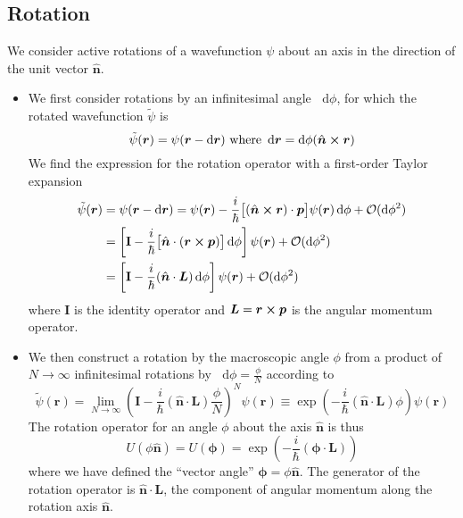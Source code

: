 \documentclass[11pt, a4paper]{article}
\newcommand{\diff}{\mathop{}\!\mathrm{d}} %
\renewcommand{\vec}[1]{\bm{#1}} %
\newcommand{\mat}[1]{\mathbf{#1}} %
\newcommand{\uvec}[1]{\hat{\vec{#1}}} %
\renewcommand{\t}[1]{\tilde{#1}}
\renewcommand{\r}{\vec{r}}  %
\newcommand{\p}{\psi}  %
\begin{document}
\subsection{Rotation}
We consider active rotations of a wavefunction $ \psi $ about an axis in the direction of the unit vector $ \uvec{n} $. 
\begin{itemize}
	\item We first consider rotations by an infinitesimal angle $ \diff \phi $, for which the rotated wavefunction $ \t{\p} $ is
	\begin{equation*}
		\t{\p}(\r) = \p(\r - \diff \r) \ \text{where } \diff \r = \diff \phi (\uvec{n} \cross \r)
	\end{equation*}
	We find the expression for the rotation operator with a first-order Taylor expansion
	\begin{align*}
		\t{\p}(\r) &= \p(\r - \diff \r) = \p(\r) - \frac{i}{\hbar}\big[(\uvec{n}\cross \r) \cdot \vec{p}\big]\p(\r)\diff \phi + \mathcal{O} (\diff \phi^{2})\\
		& = \left[\mat{I} - \frac{i}{\hbar}\big[\uvec{n}\cdot (\r \cross \vec{p})\big]\diff \phi\right] \p(\r)  + \mathcal{O} (\diff \phi^{2})\\
		& = \left[\mat{I} - \frac{i}{\hbar}(\uvec{n}\cdot \vec{L})\diff \phi\right] \p(\r) + \mathcal{O} (\diff \phi^{2})
	\end{align*}
	where $ \mat{I} $ is the identity operator and $ \vec{L} = \r \cross \vec{p} $ is the angular momentum operator. 
	
	\item We then construct a rotation by the macroscopic angle $ \phi $ from a product of $ N \to \infty $ infinitesimal rotations by $ \diff \phi = \frac{\phi}{N} $ according to 
	\begin{equation*}
		\tilde{\p}(\r) = \lim_{N \to \infty} \left(\mat{I} - \frac{i}{\hbar}(\uvec{n}\cdot \vec{L})  \frac{\phi}{N} \right)^{N}\p(\r) \equiv \exp(- \frac{i}{\hbar}(\uvec{n}\cdot \vec{L})\phi) \p(\r)
	\end{equation*}
	The rotation operator for an angle $ \phi $ about the axis $ \uvec{n} $ is thus
	\begin{equation*}
		U(\phi \uvec{n}) = U(\vec{\phi}) = \exp(- \frac{i}{\hbar}(\vec{\phi}\cdot \vec{L})) 
	\end{equation*}
	where we have defined the ``vector angle'' $ \vec{\phi} = \phi \uvec{n} $. The generator of the rotation operator is $ \uvec{n} \cdot \vec{L} $, the component of angular momentum along the rotation axis $ \uvec{n} $. 
	

\end{itemize}
\end{document}
